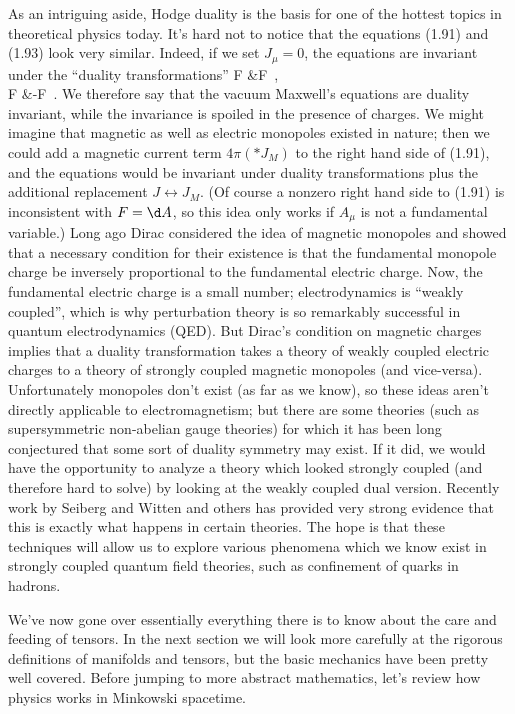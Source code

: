 \documentclass[12pt]{article}
\begin{document}
As an intriguing aside, Hodge duality is the basis for one of the hottest
topics in theoretical physics today.  It's hard not to notice that the
equations (1.91) and (1.93) look very similar.  Indeed, if we set $J_\mu=0$,
the equations are invariant under the ``duality transformations''
\bea
  F &\rightarrow \ast F\ ,\nonumber \\
  \ast F &\rightarrow -F\ .  \label{1.94}
\eea
We therefore say that the vacuum Maxwell's equations are duality
invariant, while the invariance is spoiled in the presence of charges.
We might imagine that magnetic as well as electric monopoles existed in
nature; then we could add a magnetic current term $4\pi(*J_M)$ to the
right hand side of (1.91), and the equations would be invariant under duality
transformations plus the additional replacement $J \leftrightarrow J_M$.
(Of course a nonzero right hand side to (1.91) is inconsistent with $F=\d A$,
so this idea only works if $A_\mu$ is not a fundamental variable.)
Long ago Dirac considered the idea of magnetic monopoles and showed that
a necessary condition for their existence is that the fundamental
monopole charge be inversely proportional to the fundamental electric
charge.  Now, the fundamental electric charge is a small number;
electrodynamics is ``weakly coupled'', which is why perturbation theory
is so remarkably successful in quantum electrodynamics (QED).  But
Dirac's condition on magnetic charges implies that a duality 
transformation takes a theory of weakly coupled electric charges to
a theory of strongly coupled magnetic monopoles (and vice-versa).
Unfortunately monopoles don't exist (as far as we know), so these
ideas aren't directly applicable to electromagnetism; but there are
some theories (such as supersymmetric non-abelian gauge theories) for
which it has been long conjectured that some sort of duality symmetry
may exist.  If it did, we would have the opportunity to analyze a 
theory which looked strongly coupled (and therefore hard to solve) by
looking at the weakly coupled dual version.  Recently work by Seiberg 
and Witten and others has provided very strong evidence that this is
exactly what happens in certain theories.  The hope is that these
techniques will allow us to explore various phenomena which we know
exist in strongly coupled quantum field theories, such as confinement
of quarks in hadrons.

We've now gone over essentially everything there is to know about the
care and feeding of tensors.  In the next section we will look more
carefully at the rigorous definitions of manifolds and tensors, but
the basic mechanics have been pretty well covered.  Before jumping
to more abstract mathematics, let's review how
physics works in Minkowski spacetime.
\end{document}
